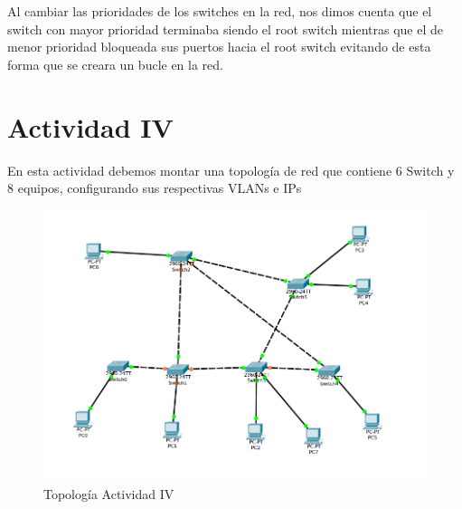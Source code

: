 \documentclass[spanish]{udpreport}
\begin{document}
Al cambiar las prioridades de los switches en la red, nos dimos cuenta que el switch con mayor prioridad terminaba siendo el root switch mientras que el de menor prioridad bloqueada sus puertos hacia el root switch evitando de esta forma que se creara un bucle en la red.
\section{Actividad IV}

En esta actividad debemos montar una topología de red que contiene 6 Switch y 8 equipos, configurando sus respectivas VLANs e IPs

\begin{figure}[H]
	\label{fig:Figura 2.4}
	\centering
	\includegraphics[scale=.6]{imagenes/A4e.png}
	\caption{Topología Actividad IV}
\end{figure}
\end{document}

